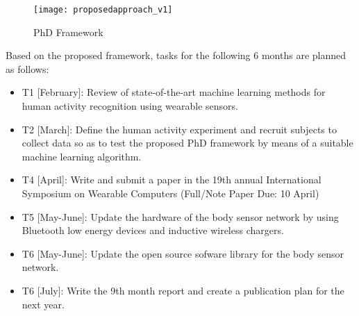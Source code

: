 \begin{figure}[htbp!] 
\centering    
\texttt{[image: proposedapproach\_v1]}
\caption[PA]{PhD Framework}
\label{fig:proposedapproach}
\end{figure}



Based on the proposed framework, 
tasks for the following 6 months are planned as follows:
\begin{itemize}[noitemsep,topsep=0pt,parsep=0pt,partopsep=0pt]
\item T1 [February]: Review of state-of-the-art machine learning methods 
for human activity recognition using wearable sensors.
\item T2 [March]: Define the human activity experiment and recruit subjects 
to collect data so as to test the proposed PhD framework by means of a suitable
machine learning algorithm.
\item T4 [April]: Write and submit a paper in the 19th annual International Symposium
on Wearable Computers (Full/Note Paper Due: 10 April)
\item T5 [May-June]: Update the hardware of the body sensor network by using
Bluetooth low energy devices and inductive wireless chargers. 
\item T6 [May-June]: Update the open source sofware library for the body sensor
network.
\item T6 [July]: Write the 9th month report and create a publication
plan for the next year.


\end{itemize}

% 

